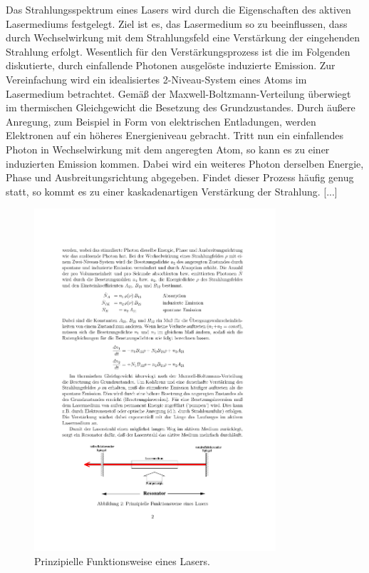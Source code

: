 Das Strahlungsspektrum eines Lasers wird durch die Eigenschaften des aktiven
Lasermediums festgelegt. Ziel ist es, das Lasermedium so zu beeinflussen, dass
durch Wechselwirkung mit dem Strahlungsfeld eine Verstärkung der eingehenden
Strahlung erfolgt. Wesentlich für den Verstärkungsprozess ist die im Folgenden
diskutierte, durch einfallende Photonen ausgelöste induzierte Emission. Zur
Vereinfachung wird ein idealisiertes 2-Niveau-System eines Atoms im Lasermedium
betrachtet. Gemäß der Maxwell-Boltzmann-Verteilung überwiegt im thermischen
Gleichgewicht die Besetzung des Grundzustandes. Durch äußere Anregung, zum
Beispiel in Form von elektrischen Entladungen, werden Elektronen auf ein höheres
Energieniveau gebracht. Tritt nun ein einfallendes Photon in Wechselwirkung mit
dem angeregten Atom, so kann es zu einer induzierten Emission kommen. Dabei wird
ein weiteres Photon derselben Energie, Phase und Ausbreitungsrichtung abgegeben.
Findet dieser Prozess häufig genug statt, so kommt es zu einer kaskadenartigen
Verstärkung der Strahlung.
[...]

\begin{figure}[htb]
  \centering
  \includegraphics[width=0.8\textwidth]{figures/fig_Resonator.pdf}
  \caption{Prinzipielle Funktionsweise eines Lasers.}
  \label{fig:Resonator}
\end{figure}

